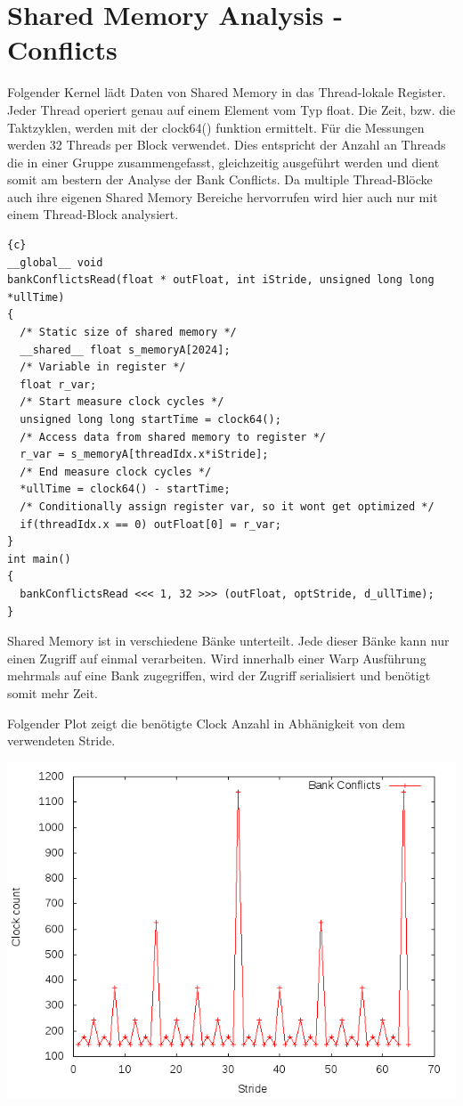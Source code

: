 \documentclass{article}
\newcommand{\enterProblemHeader}[1]{
}
\newcommand{\exitProblemHeader}[1]{
}
\newcounter{homeworkProblemCounter} %
\newcommand{\homeworkProblemName}{}
\newenvironment{homeworkProblem}[1][Problem \arabic{homeworkProblemCounter}]{ %
\stepcounter{homeworkProblemCounter} %
\renewcommand{\homeworkProblemName}{#1} %
\section{\homeworkProblemName} %
}{
}
\begin{document}
\begin{homeworkProblem}[Shared Memory Analysis - Conflicts]
Folgender Kernel lädt Daten von Shared Memory in das Thread-lokale Register. Jeder
Thread operiert genau auf einem Element vom Typ float. Die Zeit, bzw. die Taktzyklen, 
werden mit der clock64() funktion ermittelt. Für die Messungen werden 32 Threads per 
Block verwendet. Dies entspricht der Anzahl an Threads die in einer Gruppe 
zusammengefasst, gleichzeitig ausgeführt werden und dient somit am bestern der Analyse
der Bank Conflicts. Da multiple Thread-Blöcke auch ihre eigenen Shared Memory Bereiche
hervorrufen wird hier auch nur mit einem Thread-Block analysiert.
\begin{lstlisting}{c}
__global__ void 
bankConflictsRead(float * outFloat, int iStride, unsigned long long *ullTime)
{
  /* Static size of shared memory */
  __shared__ float s_memoryA[2024];
  /* Variable in register */
  float r_var;
  /* Start measure clock cycles */
  unsigned long long startTime = clock64();
  /* Access data from shared memory to register */
  r_var = s_memoryA[threadIdx.x*iStride];
  /* End measure clock cycles */
  *ullTime = clock64() - startTime;
  /* Conditionally assign register var, so it wont get optimized */
  if(threadIdx.x == 0) outFloat[0] = r_var;
}
int main()
{
  bankConflictsRead <<< 1, 32 >>> (outFloat, optStride, d_ullTime);
}
\end{lstlisting}

Shared Memory ist in verschiedene Bänke unterteilt. Jede dieser Bänke kann nur einen
Zugriff auf einmal verarbeiten. Wird innerhalb einer Warp Ausführung mehrmals auf eine 
Bank zugegriffen, wird der Zugriff serialisiert und benötigt somit mehr Zeit.

Folgender Plot zeigt die benötigte Clock Anzahl in Abhänigkeit von dem verwendeten
Stride. 
\begin{center}
\includegraphics[width=0.8\columnwidth]{conflicts.png}
\end{center}


\end{homeworkProblem}
\end{document}
